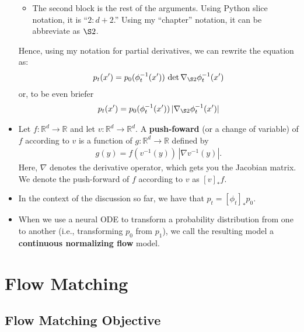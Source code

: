 \documentclass[10pt]{article}
\newcommand{\ra}{\rightarrow}
\newcommand{\Real}{\mathbb{R}}
\begin{document}
\begin{itemize}
\begin{itemize}
    \item The second block is the rest of the arguments. Using Python slice notation, it is ``$2:d+2$.'' Using my ``chapter'' notation, it can be abbreviate as $\S 2$.
  \end{itemize}
  Hence, using my notation for partial derivatives, we can rewrite the equation as:
  \begin{align*}
    p_t(x') = p_0(\phi_t^{-1}(x'))\, \det \nabla_{\S 2} \phi^{-1}_t(x')
  \end{align*}
  or, to be even briefer
  \begin{align*}
    p_t(x') = p_0(\phi_t^{-1}(x'))\, | \nabla_{\S 2} \phi^{-1}_t(x') |
  \end{align*}

  \item Let $f: \Real^d \ra \Real$ and let $v: \Real^d \ra \Real^d$. A {\bf push-foward} (or a change of variable) of $f$ according to $v$ is a function of $g:\Real^d \ra \Real$ defined by
  \begin{align*}
    g(y) = f(v^{-1}(y))\, |\nabla v^{-1}(y)|. 
  \end{align*}
  Here, $\nabla$ denotes the derivative operator, which gets you the Jacobian matrix. We denote the push-forward of $f$ according to $v$ as $[v]_* f$.

  \item In the context of the discussion so far, we have that $p_t = [\phi_t]_* p_0$.
  
  \item When we use a neural ODE to transform a probability distribution from one to another (i.e., transforming $p_0$ from $p_1$), we call the resulting model a {\bf continuous normalizing flow} model. 
\end{itemize}

\section{Flow Matching}

\subsection{Flow Matching Objective}
\end{document}
